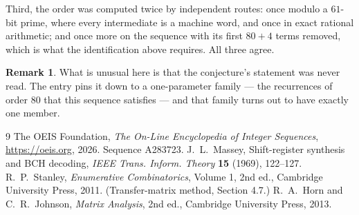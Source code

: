 \documentclass[11pt,a4paper]{article}
\theoremstyle{plain}
\theoremstyle{definition}
\newtheorem{remark}[theorem]{Remark}
\begin{document}
Third, the order was computed twice by independent routes: once modulo a $61$-bit prime, where
every intermediate is a machine word, and once in exact rational arithmetic; and once more on
the sequence with its first $80+4$ terms removed, which is what the identification above
requires. All three agree.

\begin{remark}
What is unusual here is that the conjecture's statement was never read. The entry pins it down
to a one-parameter family --- the recurrences of order $80$ that this sequence satisfies
--- and that family turns out to have exactly one member.
\end{remark}

\begin{thebibliography}{9}
 The OEIS Foundation, \emph{The On-Line Encyclopedia of Integer
Sequences}, \url{https://oeis.org}, 2026. Sequence A283723.
 J.~L.~Massey, Shift-register synthesis and BCH decoding, \emph{IEEE
Trans. Inform. Theory} \textbf{15} (1969), 122--127.
 R.~P.~Stanley, \emph{Enumerative Combinatorics}, Volume 1, 2nd ed.,
Cambridge University Press, 2011. (Transfer-matrix method, Section 4.7.)
 R.~A.~Horn and C.~R.~Johnson, \emph{Matrix Analysis}, 2nd ed., Cambridge
University Press, 2013.
\end{thebibliography}
\end{document}

